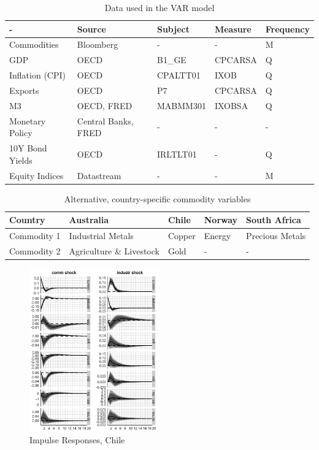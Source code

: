 \documentclass[12pt,]{article}
\begin{document}
\begin{table}[!h]

\caption{\label{tab:unnamed-chunk-3}Data used in the VAR model}
\centering
\begin{tabular}[t]{l|l|l|l|l}
\hline
- & Source & Subject & Measure & Frequency\\
\hline
Commodities & Bloomberg & - & - & M\\
\hline
GDP & OECD & B1\_GE & CPCARSA & Q\\
\hline
Inflation (CPI) & OECD & CPALTT01 & IXOB & Q\\
\hline
Exports & OECD & P7 & CPCARSA & Q\\
\hline
M3 & OECD, FRED & MABMM301 & IXOBSA & Q\\
\hline
Monetary Policy & Central Banks, FRED & - & - & -\\
\hline
10Y Bond Yields & OECD & IRLTLT01 & - & Q\\
\hline
Equity Indices & Datastream & - & - & M\\
\hline
\end{tabular}
\end{table}

\begin{table}[!h]

\caption{\label{tab:unnamed-chunk-4}Alternative, country-specific commodity variables}
\centering
\begin{tabular}[t]{l|l|l|l|l}
\hline
Country & Australia & Chile & Norway & South Africa\\
\hline
Commodity 1 & Industrial Metals & Copper & Energy & Precious Metals\\
\hline
Commodity 2 & Agriculture \& Livestock & Gold & - & -\\
\hline
\end{tabular}
\end{table}

\begin{figure}
\centering
\includegraphics[width=0.50000\textwidth]{img/irf_short_CHL.png}
\caption{Impulse Responses, Chile}
\end{figure}
\end{document}
